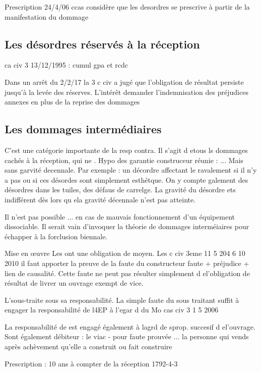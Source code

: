 		Prescription 24/4/06 ccas considère que les desordres se prescrive à partir de la manifestation du dommage

	\subsection{Les désordres réservés à la réception}

		ca civ 3 13/12/1995 : cumul gpa et rcdc

		Dans un arrêt du 2/2/17 la 3 c civ a jugé que l'obligation de résultat persiste jusqu'à la levée des réserves. L'intérêt demander l'indemnisation des préjudices annexes en plus de la reprise des dommages

	\subsection{Les dommages intermédiaires}

		C'est une catégorie importante de la resp contra. Il s'agit d etous ls dommages cachés à la réception, qui ne . Hypo des garantie construceur réunie :
			...
		Mais sans garvité decennale. Par exemple : un décordre affectant le ravalement si il n'y a pas ou si ces désordes sont simplement esthétque. On y compte galement des désordres dans les tuiles, des défaus de carrelge.
		La gravité du désordre ets indifférent dès lors qu ela gravité décennale n'est pas atteinte.

		Il n'est pas possible ... en cas de mauvais fonctionnement d'un équipement dissociable. Il serait vain d'invoquer la théorie de dommages interméiaires pour échapper à la forclusion biennale.


		Mise en œuvre Les \lo ont une obligation de moyen. Les c civ 3eme 11 5 204 6 10 2010 il faut apporter la preuve de la faute du constructeur
			faute + préjudice + lien de causalité.
			Cette faute ne peut pas résulter simplement d el'obligation de résultat de livrer un ouvrage exempt de vice.

			L'\E sous-traite sous sa responsabilité. La simple faute du sous traitant suffit à engager la responsabilité de l4EP à l'egar d du Mo cas civ 3 1 5 2006

			La responsabilité de est engagé également à lagrd de sprop. succesif d el'ouvrage.
			Sont également débiteur :
				le viac - pour faute prouvée ...
				la personne qui vends après achèvement qu'elle a construit ou fait construire

			Prescription : 10 ans à compter de la réception 1792-4-3

